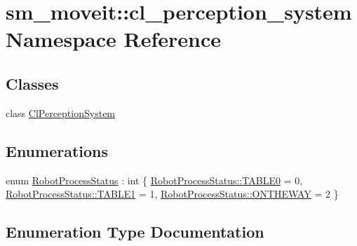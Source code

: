 \hypertarget{namespacesm__moveit_1_1cl__perception__system}{}\section{sm\+\_\+moveit\+:\+:cl\+\_\+perception\+\_\+system Namespace Reference}
\label{namespacesm__moveit_1_1cl__perception__system}
\subsection*{Classes}
\begin{DoxyCompactItemize}
\item 
class \hyperlink{classsm__moveit_1_1cl__perception__system_1_1ClPerceptionSystem}{Cl\+Perception\+System}
\end{DoxyCompactItemize}
\subsection*{Enumerations}
\begin{DoxyCompactItemize}
\item 
enum \hyperlink{namespacesm__moveit_1_1cl__perception__system_a730c3fd4da64d10a75ca4ab014fdbe40}{Robot\+Process\+Status} \+: int \{ \hyperlink{namespacesm__moveit_1_1cl__perception__system_a730c3fd4da64d10a75ca4ab014fdbe40a1fd65c0ced0ead229bf6dd6a59067a4f}{Robot\+Process\+Status\+::\+T\+A\+B\+L\+E0} = 0, 
\hyperlink{namespacesm__moveit_1_1cl__perception__system_a730c3fd4da64d10a75ca4ab014fdbe40a5b22e42e5d94a94037a4486a4976c49d}{Robot\+Process\+Status\+::\+T\+A\+B\+L\+E1} = 1, 
\hyperlink{namespacesm__moveit_1_1cl__perception__system_a730c3fd4da64d10a75ca4ab014fdbe40a92f7ea3097b3fdb1b7a25669cfc1b8bd}{Robot\+Process\+Status\+::\+O\+N\+T\+H\+E\+W\+AY} = 2
 \}
\end{DoxyCompactItemize}


\subsection{Enumeration Type Documentation}
\mbox{\label{namespacesm__moveit_1_1cl__perception__system_a730c3fd4da64d10a75ca4ab014fdbe40}} 
